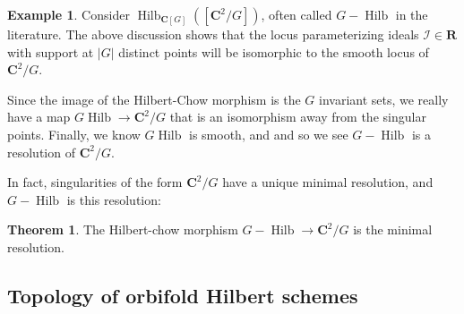 \documentclass{amsart}[12pt]
\theoremstyle{definition}
\newtheorem{theorem}[dummy]{Theorem}
\newtheorem{example}[dummy]{Example}
\newcommand{\C}{\mathbf{C}}
\newcommand{\R}{\mathbf{R}}
\newcommand{\II}{\mathcal{I}}
\DeclareMathOperator{\Hilb}{Hilb}
\begin{document}
\begin{example}
  Consider $\Hilb_{\C[G]}([\C^2/G])$, often called $G-\Hilb$ in the literature.  The above discussion shows that the locus parameterizing ideals $\II\in\R$ with support at $|G|$ distinct points will be isomorphic to the smooth locus of $\C^2/G$.

  Since the image of the Hilbert-Chow morphism is the $G$ invariant sets, we really have a map $G\Hilb\to \C^2/G$ that is an isomorphism away from the singular points.  Finally, we know $G\Hilb$ is smooth, and and so we see $G-\Hilb$ is a resolution of $\C^2/G$. 
\end{example}

  
\begin{center}
\end{center}

In fact, singularities of the form $\C^2/G$ have a unique minimal resolution, and $G-\Hilb$ is this resolution:


\begin{theorem} \label{thm:GHilb-resolution}
The Hilbert-chow morphism $G-\Hilb\to \C^2/G$ is the minimal resolution.
\end{theorem}


\subsection{Topology of orbifold Hilbert schemes}
\end{document}
